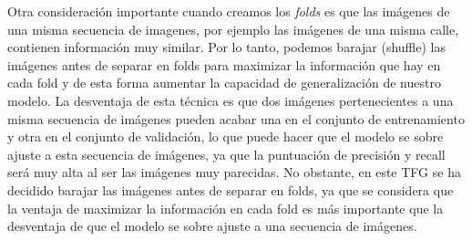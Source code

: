 Otra consideración importante cuando creamos los \textit{folds} es que las imágenes de una misma secuencia de imagenes, por ejemplo las imágenes de una misma calle, contienen información muy similar. Por lo tanto, podemos barajar (shuffle) las imágenes antes de separar en folds para maximizar la información que hay en cada fold y de esta forma aumentar la capacidad de generalización de nuestro modelo. La desventaja de esta técnica es que dos imágenes pertenecientes a una misma secuencia de imágenes pueden acabar una en el conjunto de entrenamiento y otra en el conjunto de validación, lo que puede hacer que el modelo se sobre ajuste a esta secuencia de imágenes, ya que la puntuación de precisión y recall será muy alta al ser las imágenes muy parecidas. No obstante, en este TFG se ha decidido barajar las imágenes antes de separar en folds, ya que se considera que la ventaja de maximizar la información en cada fold es más importante que la desventaja de que el modelo se sobre ajuste a una secuencia de imágenes.